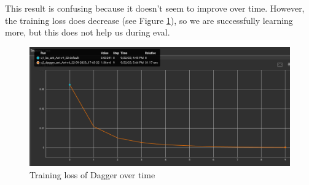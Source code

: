 \documentclass[11pt]{article}
\begin{document}
This result is confusing because it doesn't seem to improve over time.
However, the training loss does decrease (see Figure \ref{fig:loss}), so we are successfully learning more, but this does not help us during eval. 

\begin{figure}[h] 
    \centering
    \includegraphics[width=0.55 \linewidth]{09-29-loss}
    \caption{Training loss of Dagger over time}
    \label{fig:loss}
\end{figure}
\end{document}
